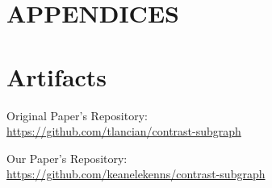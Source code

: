 \documentclass[sigconf]{acmart}
\begin{document}



\appendix
\section*{APPENDICES}
\section{Artifacts} \label{artifacts}

Original Paper's Repository:\\
\url{https://github.com/tlancian/contrast-subgraph}

Our Paper's Repository:\\
\url{https://github.com/keanelekenns/contrast-subgraph}
\end{document}
